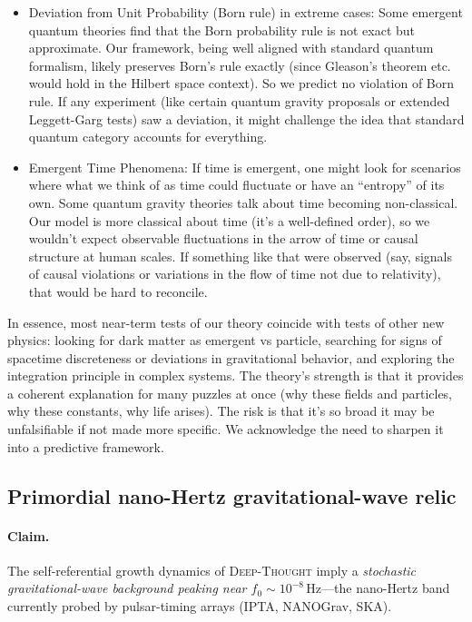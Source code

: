 \documentclass{article}
\begin{document}
\begin{itemize}
\item Deviation from Unit Probability (Born rule) in extreme cases: Some emergent quantum theories find that the Born probability rule is not exact but approximate. Our framework, being well aligned with standard quantum formalism, likely preserves Born’s rule exactly (since Gleason’s theorem etc. would hold in the Hilbert space context). So we predict no violation of Born rule. If any experiment (like certain quantum gravity proposals or extended Leggett-Garg tests) saw a deviation, it might challenge the idea that standard quantum category accounts for everything.
\item Emergent Time Phenomena: If time is emergent, one might look for scenarios where what we think of as time could fluctuate or have an “entropy” of its own. Some quantum gravity theories talk about time becoming non-classical. Our model is more classical about time (it’s a well-defined order), so we wouldn’t expect observable fluctuations in the arrow of time or causal structure at human scales. If something like that were observed (say, signals of causal violations or variations in the flow of time not due to relativity), that would be hard to reconcile.
\end{itemize}

In essence, most near-term tests of our theory coincide with tests of other new physics: looking for dark matter as emergent vs particle, searching for signs of spacetime discreteness or deviations in gravitational behavior, and exploring the integration principle in complex systems. The theory’s strength is that it provides a coherent explanation for many puzzles at once (why these fields and particles, why these constants, why life arises). The risk is that it’s so broad it may be unfalsifiable if not made more specific. We acknowledge the need to sharpen it into a predictive framework.

\subsection{Primordial nano-Hertz gravitational-wave relic}
\label{subsec:nHz_GW}

\paragraph{Claim.}
The self-referential growth dynamics of \textsc{Deep-Thought} imply a
\emph{stochastic gravitational-wave background peaking near
\(f_{0}\!\sim\!10^{-8}\,\mathrm{Hz}\)}—the nano-Hertz band currently
probed by pulsar-timing arrays (IPTA, NANOGrav, SKA).
\end{document}
